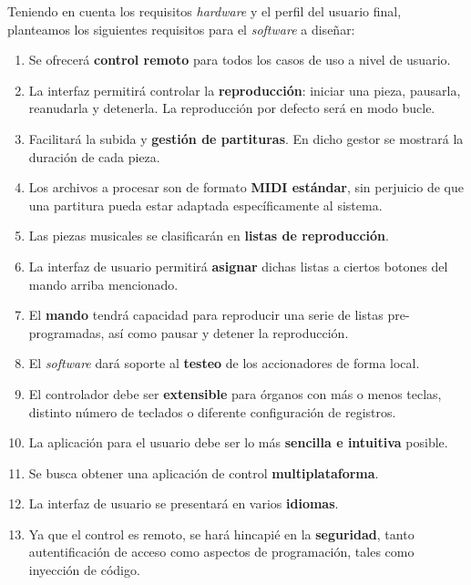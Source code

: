Teniendo en cuenta los requisitos \textit{hardware} y el perfil del usuario final, planteamos los siguientes requisitos para el \textit{software} a diseñar:

\begin{enumerate}

	\item Se ofrecerá \textbf{control remoto} para todos los casos de uso a nivel de usuario.
	
	\item La interfaz permitirá controlar la \textbf{reproducción}: iniciar una pieza, pausarla, reanudarla y detenerla. La reproducción por defecto será en modo bucle.
	
	\item Facilitará la subida y \textbf{gestión de partituras}. En dicho gestor se mostrará la duración de cada pieza.
	
	\item Los archivos a procesar son de formato \textbf{\acrshort{MIDI} estándar}, sin perjuicio de que una partitura pueda estar adaptada específicamente al sistema.
	
	\item Las piezas musicales se clasificarán en \textbf{listas de reproducción}.
	
	\item La interfaz de usuario permitirá \textbf{asignar} dichas listas a ciertos botones del mando arriba mencionado.
	
	\item El \textbf{mando} tendrá capacidad para reproducir una serie de listas pre-programadas, así como pausar y detener la reproducción.
	
	\item El \textit{software} dará soporte al \textbf{testeo} de los accionadores de forma local.
	
	\item El controlador debe ser \textbf{extensible} para órganos con más o menos teclas, distinto número de teclados o diferente configuración de registros.
	
	\item La aplicación para el usuario debe ser lo más \textbf{sencilla e intuitiva} posible.
	
	\item Se busca obtener una aplicación de control \textbf{multiplataforma}.
	
	\item La interfaz de usuario se presentará en varios \textbf{idiomas}.
	
	\item Ya que el control es remoto, se hará hincapié en la \textbf{seguridad}, tanto autentificación de acceso como aspectos de programación, tales como inyección de código.

\end{enumerate}

